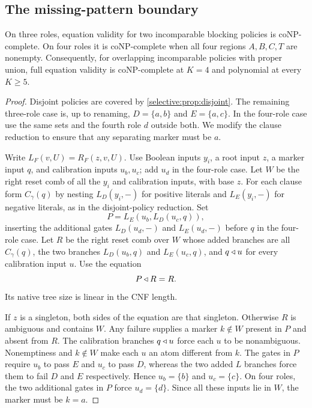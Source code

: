 \subsection{The missing-pattern boundary}

\begin{theorem}\label{selective:thm:calibration}
On three roles, equation validity for two incomparable blocking
policies is coNP-complete. On four roles it is coNP-complete when
all four regions $A,B,C,T$ are nonempty.
Consequently, for overlapping incomparable policies with proper union, full equation
validity is coNP-complete at $K=4$ and polynomial at every $K\geq5$.
\end{theorem}
\begin{proof}
Disjoint policies are covered by \cref{selective:prop:disjoint}.
The remaining three-role case is, up to renaming,
$D=\{a,b\}$ and $E=\{a,c\}$. In the four-role case use the same
sets and the fourth role $d$ outside both. We modify the clause
reduction to ensure that any separating marker must be $a$.

Write $L_F(v,U)=R_F(z,v,U)$. Use Boolean inputs $y_i$, a root input
$z$, a marker input $q$, and calibration inputs $u_b,u_c$; add $u_d$
in the four-role case. Let $W$ be the right reset comb of all the
$y_i$ and calibration inputs, with base $z$. For each clause form
$C_\gamma(q)$ by nesting $L_D(y_i,-)$ for positive literals and
$L_E(y_i,-)$ for negative literals, as in the disjoint-policy reduction.
Set
\[
 P=L_E(u_b,L_D(u_c,q)),
\]
inserting the additional gates $L_D(u_d,-)$ and $L_E(u_d,-)$ before
$q$ in the four-role case. Let $R$ be the right reset comb over $W$
whose added branches are all $C_\gamma(q)$, the two branches
$L_D(u_b,q)$ and $L_E(u_c,q)$, and $q\mathbin{\triangleleft} u$ for every calibration
input $u$. Use the equation
\begin{equation}\label{selective:eq:calibration}
 P\mathbin{\triangleleft} R=R.
\end{equation}
Its native tree size is linear in the CNF length.

If $z$ is a singleton, both sides of the equation are that singleton.
Otherwise $R$ is ambiguous and contains $W$. Any failure supplies a
marker $k\notin W$ present in $P$ and absent from $R$. The calibration
branches $q\mathbin{\triangleleft} u$ force each $u$ to be nonambiguous. Nonemptiness
and $k\notin W$ make each $u$ an atom different from $k$.
The gates in $P$ require $u_b$ to pass $E$ and $u_c$ to pass $D$,
whereas the two added $L$ branches force them to fail $D$ and $E$
respectively. Hence $u_b=\{b\}$ and $u_c=\{c\}$. On four roles,
the two additional gates in $P$ force $u_d=\{d\}$. Since all these
inputs lie in $W$, the marker must be $k=a$.


\end{proof}
